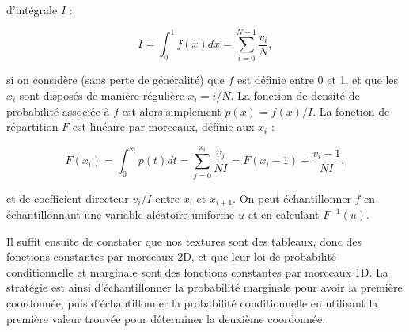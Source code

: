 d'intégrale $I$ :

\begin{equation}
    I = \int_{0}^{1} f(x) dx = \sum_{i=0}^{N-1} \frac{v_i}N,
\end{equation}

si on considère (sans perte de généralité) que $f$ est définie entre 0 et 1, et que les $x_i$ sont disposés de manière régulière $x_i = i / N$. La fonction de densité de probabilité associée à $f$ est alors simplement $p(x) = f(x) / I$. La fonction de répartition $F$ est linéaire par morceaux, définie aux $x_i$ :

\begin{equation}
    F(x_i) = \int_{0}^{x_i} p(t) dt = \sum_{j=0}^{x_i} \frac{v_j}{NI} = F(x_i-1) + \frac{v_i-1}{NI},
\end{equation}

et de coefficient directeur $v_i/I$ entre $x_i$ et $x_{i+1}$. On peut échantillonner $f$ en échantillonnant une variable aléatoire uniforme $u$ et en calculant $F^{-1}(u)$.

\bigskip

%
%
%

Il suffit ensuite de constater que nos textures sont des tableaux, donc des fonctions constantes par morceaux 2D, et que leur loi de probabilité conditionnelle et marginale sont des fonctions constantes par morceaux 1D. La stratégie est ainsi d'échantillonner la probabilité marginale pour avoir la première coordonnée, puis d'échantillonner la probabilité conditionnelle en utilisant la première valeur trouvée pour déterminer la deuxième coordonnée.


